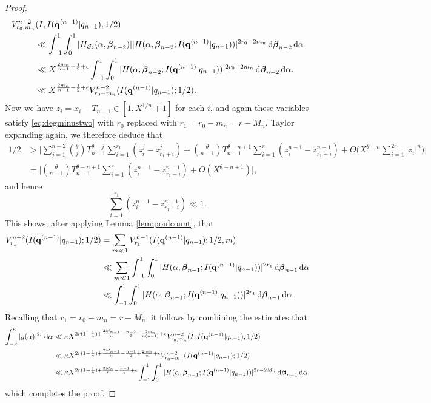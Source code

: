 \documentclass[11pt,reqno]{amsart}
\numberwithin{equation}{section}
\renewcommand{\d}{\,{\rm d}}
\begin{document}
\begin{proof}
\begin{align*} 
V_{r_0,m_n}^{n-2} & (I,I({\mathbf{q}^{(n-1)}|q_{n-1}}),1/2) 
\\ 
&\ll \int_{-1}^{1} \int_{0}^{1} |H_{\mathcal{S}_2}(\alpha, \boldsymbol{\beta}_{n-2})| |H(\alpha,\boldsymbol{\beta}_{n-2};I({\mathbf{q}^{(n-1)}|q_{n-1}}) )|^{2r_0-2m_n} \d \boldsymbol{\beta}_{n-2} \d \alpha 
\\ 
& \ll X^{\frac{2m_n}{n-1}-\frac{1}{2}+\epsilon} \int_{-1}^{1} \int_{0}^{1} |H(\alpha,\boldsymbol{\beta}_{n-2};I({\mathbf{q}^{(n-1)}|q_{n-1}}) )|^{2r_0-2m_n} \d \boldsymbol{\beta}_{n-2} \d \alpha. 
\\ 
& \ll X^{\frac{2m_n}{n-1}-\frac{1}{2}+\epsilon} V_{r_0-m_n}^{n-2}(I({\mathbf{q}^{(n-1)}|q_{n-1}});1/2). 
\end{align*}
Now we have $z_i = x_i-T_{n-1} \in [1,X^{1/n}+1]$ for each $i$, and again these variables satisfy \eqref{eq:degminustwo} with $r_0$ replaced with $r_1 = r_0-m_n=r-M_n$. Taylor expanding again, we therefore deduce that 
\begin{align*} 
1/2 & > \Big| \sum_{j=1}^{n-2} \binom{\theta}{j} T_{n-1}^{\theta-j} \sum_{i=1}^{r_1} (z_i^j-z_{r_1+i}^j) + \binom{\theta}{n-1}T_{n-1}^{\theta-n+1} \sum_{i=1}^{r_1} (z_i^{n-1} -z_{r_1+i}^{n-1}) + O\Big(X^{\theta-n}\sum_{i=1}^{2r_1} |z_i|^n\Big) \Big|
\\ 
& = \Big| \binom{\theta}{n-1}T_{n-1}^{\theta-n+1} \sum_{i=1}^{r_1} (z_i^{n-1} -z_{r_1+i}^{n-1}) + O(X^{\theta-n+1}) \Big|,
\end{align*}
and hence 
\[ \sum_{i=1}^{r_1} (z_i^{n-1} -z_{r_1+i}^{n-1}) \ll 1. \]
This shows, after applying Lemma \ref{lem:poulcount}, that 
\begin{align*}
V_{r_1}^{n-2}(I({\mathbf{q}^{(n-1)}|q_{n-1}});1/2) & = \sum_{m \ll 1} V_{r_1}^{n-1}(I({\mathbf{q}^{(n-1)}|q_{n-1}});1/2, m)
\\ 
& \ll \sum_{m \ll 1} \int_{-1}^{1} \int_{0}^{1} |H(\alpha,\boldsymbol{\beta}_{n-1};I({\mathbf{q}^{(n-1)}|q_{n-1}}) )|^{2r_1} \d \boldsymbol{\beta}_{n-1} \d \alpha
\\ 
& \ll \int_{-1}^{1} \int_{0}^{1} |H(\alpha,\boldsymbol{\beta}_{n-1};I({\mathbf{q}^{(n-1)}|q_{n-1}}) )|^{2r_1} \d \boldsymbol{\beta}_{n-1} \d \alpha. 
\end{align*}
Recalling that $r_1 = r_0-m_n = r-M_n$, it follows by combining the estimates that 
\begin{align*} 
\int_{-\kappa}^{\kappa} |g(\alpha)|^{2r} \d\alpha & \ll \kappa X^{2r(1-\frac{1}{n})+\frac{2M_{n-1}}{n}-\frac{n-2}{2}-\frac{2m_{n}}{n(n-1)}+\epsilon} V_{r_0,m_n}^{n-2}(I,I({\mathbf{q}^{(n-1)}|q_{n-1}}),1/2) \\ 
& \ll \kappa X^{2r(1-\frac{1}{n})+\frac{2M_{n-1}}{n}-\frac{n-1}{2}+\frac{2m_{n}}{n}+\epsilon} V_{r_0-m_n}^{n-2}(I({\mathbf{q}^{(n-1)}|q_{n-1}});1/2)
\\ 
& \ll \kappa X^{2r(1-\frac{1}{n})+\frac{2M_{n}}{n}-\frac{n-1}{2}+\epsilon} \int_{-1}^{1} \int_{0}^{1} |H(\alpha,\boldsymbol{\beta}_{n-1};I({\mathbf{q}^{(n-1)}|q_{n-1}}) )|^{2r-2M_n} \d \boldsymbol{\beta}_{n-1} \d \alpha, 
\end{align*}
which completes the proof. 
\end{proof}
\end{document}
